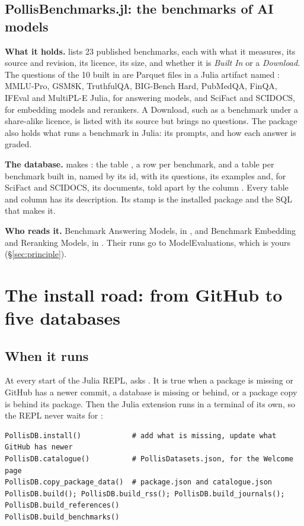 \subsection{PollisBenchmarks.jl: the benchmarks of AI models}
\textbf{What it holds.}  lists 23 published benchmarks, each with what it measures, its
source and revision, its licence, its size, and whether it is \emph{Built In} or a \emph{Download}. The questions of
the 10 built in are Parquet files in a Julia artifact named : MMLU-Pro, GSM8K, TruthfulQA, BIG-Bench
Hard, PubMedQA, FinQA, IFEval and MultiPL-E Julia, for answering models, and SciFact and SCIDOCS, for embedding models
and rerankers. A Download, such as a benchmark under a share-alike licence, is listed with its source but brings no
questions. The package also holds what runs a benchmark in Julia: its prompts, and how each answer is graded.

\textbf{The database.}  makes : the table
, a row per benchmark, and a table per benchmark built in, named by its id, with its questions, its
examples and, for SciFact and SCIDOCS, its documents, told apart by the column . Every table and column
has its description. Its stamp is the installed package and the SQL that makes it.

\textbf{Who reads it.} Benchmark Answering Models, in , and Benchmark Embedding
and Reranking Models, in . Their runs go to ModelEvaluations, which is yours
(\S\ref{sec:principle}).

\section{The install road: from GitHub to five databases}\label{sec:install}

\subsection{When it runs}
At every start of the Julia REPL,  asks . It is true when a
package is missing or GitHub has a newer commit, a database is missing or behind, or a package copy is behind its
package. Then the Julia extension runs  in a terminal of its own, so the REPL never waits for
:
\begin{lstlisting}
PollisDB.install()            # add what is missing, update what GitHub has newer
PollisDB.catalogue()          # PollisDatasets.json, for the Welcome page
PollisDB.copy_package_data()  # package.json and catalogue.json
PollisDB.build(); PollisDB.build_rss(); PollisDB.build_journals(); PollisDB.build_references()
PollisDB.build_benchmarks()
\end{lstlisting}

